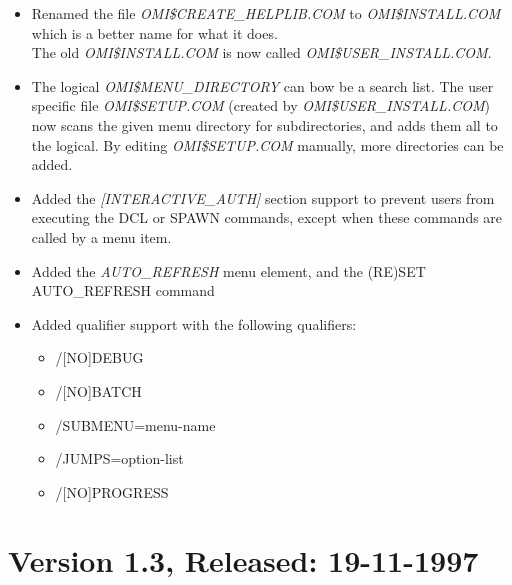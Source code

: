 \documentclass[a4paper]{book}
\begin{document}
\begin{itemize}
\item Renamed the file \textsl{OMI{\$}CREATE{\_}HELPLIB.COM} to \textsl{OMI{\$}INSTALL.COM} which is a better name for what it does. \\
The old \textsl{OMI{\$}INSTALL.COM} is now called \textsl{OMI{\$}USER{\_}INSTALL.COM}.
\item The logical \textsl{OMI{\$}MENU{\_}DIRECTORY} can bow be a search list. The user specific file \textsl{OMI{\$}SETUP.COM} (created by \textsl{OMI{\$}USER{\_}INSTALL.COM}) now scans the given menu directory for subdirectories, and adds them all to the logical. By editing \textsl{OMI{\$}SETUP.COM} manually, more directories can be added.
\item Added the \textsl{[INTERACTIVE{\_}AUTH]} section support to prevent users from executing the \textsf{DCL} or \textsf{SPAWN} commands, except when these commands are called by a menu item.
\item Added the \textsl{AUTO{\_}REFRESH} menu element, and the \textsf{(RE)SET AUTO{\_}REFRESH} command
\item Added qualifier support with the following qualifiers:
\begin{itemize}
\item \textsf{/[NO]DEBUG}
\item \textsf{/[NO]BATCH}
\item \textsf{/SUBMENU=menu-name}
\item \textsf{/JUMPS=option-list}
\item \textsf{/[NO]PROGRESS}
\end{itemize}
\end{itemize}

\section*{Version 1.3, Released: 19-11-1997}
\end{document}

